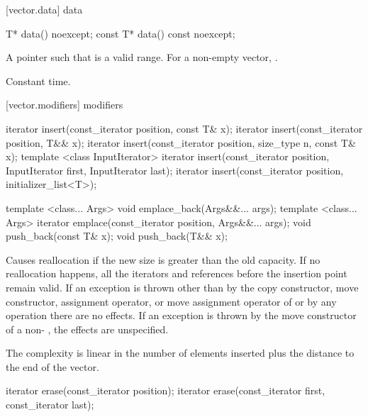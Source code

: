 [vector.data]{ data}

%
\begin{itemdecl}
T*         data() noexcept;
const T*   data() const noexcept;
\end{itemdecl}

\begin{itemdescr}
\pnum
\returns
A pointer such that  is a valid range. For a
non-empty vector,  \tcode{==} .

\pnum
\complexity
Constant time.
\end{itemdescr}

[vector.modifiers]{ modifiers}

%
\begin{itemdecl}
iterator insert(const_iterator position, const T& x);
iterator insert(const_iterator position, T&& x);
iterator insert(const_iterator position, size_type n, const T& x);
template <class InputIterator>
  iterator insert(const_iterator position, InputIterator first, InputIterator last);
iterator insert(const_iterator position, initializer_list<T>);

template <class... Args> void emplace_back(Args&&... args);
template <class... Args> iterator emplace(const_iterator position, Args&&... args);
void push_back(const T& x);
void push_back(T&& x);
\end{itemdecl}

\begin{itemdescr}
\pnum
\notes
Causes reallocation if the new size is greater than the old capacity.
If no reallocation happens, all the iterators and references before the insertion point remain valid.
If an exception is thrown other than by
the copy constructor, move constructor,
assignment operator, or move assignment operator of
 or by any  operation
there are no effects.
If an exception is thrown by the move constructor of a non-
, the effects are unspecified.

\pnum
\complexity
The complexity is linear in the number of elements inserted plus the distance
to the end of the vector.
\end{itemdescr}

%
\begin{itemdecl}
iterator erase(const_iterator position);
iterator erase(const_iterator first, const_iterator last);
\end{itemdecl}

